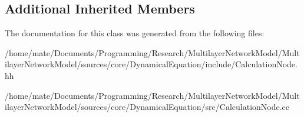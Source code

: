 \subsection*{Additional Inherited Members}


The documentation for this class was generated from the following files\+:\begin{DoxyCompactItemize}
\item 
/home/mate/\+Documents/\+Programming/\+Research/\+Multilayer\+Network\+Model/\+Multilayer\+Network\+Model/sources/core/\+Dynamical\+Equation/include/Calculation\+Node.\+hh\item 
/home/mate/\+Documents/\+Programming/\+Research/\+Multilayer\+Network\+Model/\+Multilayer\+Network\+Model/sources/core/\+Dynamical\+Equation/src/Calculation\+Node.\+cc\end{DoxyCompactItemize}
